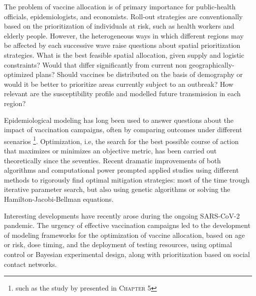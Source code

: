 The problem of vaccine allocation is of primary importance for  public-health officials, epidemiologists, and economists\cite{Emanuel:EthicalFrameworkGlobal:2020, Lipsitch:UnderstandingCOVID19Vaccine:2020}. 
Roll-out strategies are conventionally based on the prioritization of individuals at risk, such as health workers and elderly people\cite{Bubar:ModelinformedCOVID19Vaccine:2021,Fitzpatrick:OptimizingAgespecificVaccination:2021,Baden:EfficacySafetyMRNA1273:2020,Yang:WhoShouldBe:2021}. However, the heterogeneous ways in which different regions may be affected by each successive wave raise questions about spatial prioritization strategies. What is the best feasible spatial allocation, given supply and logistic constraints? Would that differ significantly from current non geographically-optimized plans? Should vaccines be distributed on the basis of demography or would it be better to prioritize areas currently subject to an outbreak? How relevant are the susceptibility profile and modelled future transmission in each region? 

Epidemiological modeling has long been used to answer questions about the impact of vaccination campaigns, often by comparing outcomes under different scenarios \footnote{such as the study by \textcite{Lee:AchievingCoordinatedNational:2020} presented in \textsc{Chapter 5}}. Optimization, i.e, the search for the best possible course of action that maximizes or minimizes an objective metric, has been carried out theoretically since the seventies\cite{Morton:OptimalControlDeterministic:1974,Sethi:OptimalControlSimple:1978, Greenhalgh:ResultsOptimalControl:1988}. Recent dramatic improvements of both algorithms\cite{Quirynen:MultipleShootingMicrosecond:2015} and computational power prompted applied studies using different methods to rigorously find optimal mitigation strategies: most of the time trough iterative parameter search\cite{Sah:OptimizingImpactLowefficacy:2018, Medlock:OptimizingInfluenzaVaccine:2009}, but also using genetic algorithms\cite{Patel:FindingOptimalVaccination:2005} or solving the Hamilton-Jacobi-Bellman equations\cite{Zakary:AnalysisMultiregionsDiscrete:2017, MillerNeilan:OptimalVaccineDistribution:2011}.

Interesting developments have recently arose during the ongoing SARS-CoV-2 pandemic\cite{Fitzpatrick:OptimizingAgespecificVaccination:2021, Thul:StochasticOptimizationVaccine:2021,Moore:VaccinationNonPharmaceuticalInterventions:2021}. The urgency of effective vaccination campaigns led to the development of modeling frameworks for the optimization of vaccine allocation, based on age or risk\cite{Matrajt:VaccineOptimizationCOVID19:2020a,Spassiani:VaccinationCriteriaBased:2020,Fitzpatrick:OptimizingAgespecificVaccination:2021, Bubar:ModelinformedCOVID19Vaccine:2021}, dose timing\cite{Saad-Roy:EpidemiologicalEvolutionaryConsiderations:2021, Kadire:DelayedSecondDose:2021}, and the deployment of testing resources, using optimal control\cite{Acemoglu:OptimalAdaptiveTesting:2021} or Bayesian experimental design\cite{Chatzimanolakis:OptimalAllocationLimited:2020}, along with prioritization based on social contact networks\cite{Chen:PrioritizingAllocationCOVID19:2021}. 

